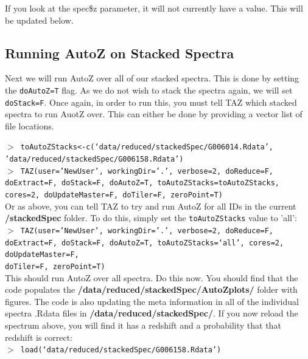 \documentclass[12pt]{article}
\begin{document}
 If you look at the spec\$z parameter, it will not currently have a value. This will be updated below.
 

 \subsection{Running AutoZ on Stacked Spectra}
 
 Next we will run AutoZ over all of our stacked spectra. This is done by setting the \texttt{doAutoZ=T} flag. As we do not wish to stack the spectra again, we will set \texttt{doStack=F}. Once again, in order to run this, you must tell TAZ which stacked spectra to run AuotZ over. This can either be done by providing a vector list of file locations.
 
 \hspace{10mm} \texttt{$>$ toAutoZStacks<-c(`data/reduced/stackedSpec/G006014.Rdata',  \\ 'data/reduced/stackedSpec/G006158.Rdata')}\\
 
 \hspace{10mm} \texttt{$>$ TAZ(user='NewUser', workingDir='.', verbose=2, doReduce=F, doExtract=F, doStack=F,  doAutoZ=T, toAutoZStacks=toAutoZStacks, cores=2, doUpdateMaster=F, doTiler=F, zeroPoint=T)}\\ 
 
Or as above, you can tell TAZ to try and run AutoZ for all IDs in the current \textbf{/stackedSpec} folder. To do this, simply set the \texttt{toAutoZStacks} value to 'all': \\
  

  \hspace{10mm} \texttt{$>$ TAZ(user='NewUser', workingDir='.', verbose=2, doReduce=F, doExtract=F, doStack=F, doAutoZ=T,  toAutoZStacks=`all',  cores=2, doUpdateMaster=F, \\ doTiler=F, zeroPoint=T)}\\  
  
This should run AutoZ over all spectra. Do this now. You should find that the code populates the \textbf{/data/reduced/stackedSpec/AutoZplots/} folder with figures. The code is also updating the meta information in all of the individual spectra .Rdata files in \textbf{/data/reduced/stackedSpec/}. If you now reload the spectrum above, you will find it has a redshift and a probability that that redshift is correct:\\  

\hspace{10mm} \texttt{$>$ load(`data/reduced/stackedSpec/G006158.Rdata')} \\
\end{document}
